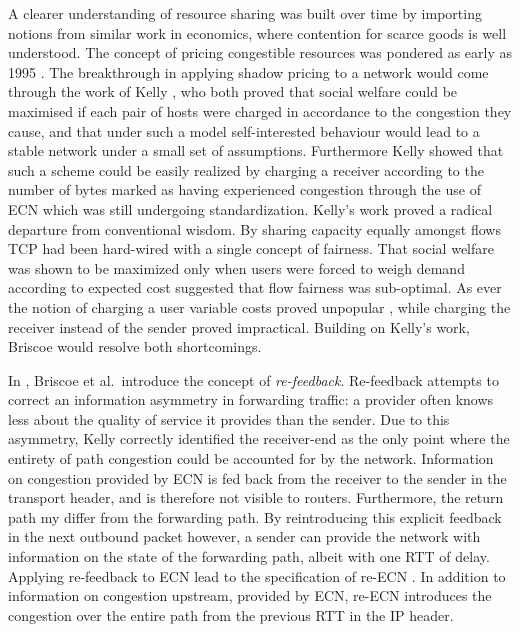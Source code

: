 A clearer understanding of resource sharing was built over time by importing notions from similar work in economics, where contention for scarce goods is well understood. 
The concept of pricing congestible resources was pondered as early as 1995 \cite{MacKieMason:1995p493}. 
The breakthrough in applying shadow pricing to a network would come through the work of Kelly \cite{Kelly:1998p139}, who both proved that social welfare could be maximised if each pair of hosts were charged in accordance to the congestion they cause, and that under such a model self-interested behaviour would lead to a stable network under a small set of assumptions.
Furthermore Kelly showed that such a scheme could be easily realized by charging a receiver according to the number of bytes marked as having experienced congestion through the use of \ac{ECN} which was still undergoing standardization.
Kelly's work proved a radical departure from conventional wisdom. 
By sharing capacity equally amongst flows \ac{TCP} had been hard-wired with a single concept of fairness.
That social welfare was shown to be maximized only when users were forced to weigh demand according to expected cost suggested that flow fairness was sub-optimal.
As ever the notion of charging a user variable costs proved unpopular \cite{Odlyzko:2004p290}, while charging the receiver instead of the sender proved impractical.
Building on Kelly's work, Briscoe would resolve both shortcomings.

In \cite{Briscoe:2005p346}, Briscoe et al.\ introduce the concept of \emph{re-feedback}.
Re-feedback attempts to correct an information asymmetry in forwarding traffic: a provider often knows less about the quality of service it provides than the sender.
Due to this asymmetry, Kelly correctly identified the receiver-end as the only point where the entirety of path congestion could be accounted for by the network.
Information on congestion provided by \ac{ECN} is fed back from the receiver to the sender in the transport header, and is therefore not visible to routers.
Furthermore, the return path my differ from the forwarding path.
By reintroducing this explicit feedback in the next outbound packet however, a sender can provide the network with information on the state of the forwarding path, albeit with one \ac{RTT} of delay.
Applying re-feedback to \ac{ECN} lead to the specification of re-\ac{ECN} \cite{Briscoe:2008p494}. 
In addition to information on congestion upstream, provided by \ac{ECN}, re-\ac{ECN} introduces the congestion over the entire path from the previous \ac{RTT} in the \ac{IP} header.

